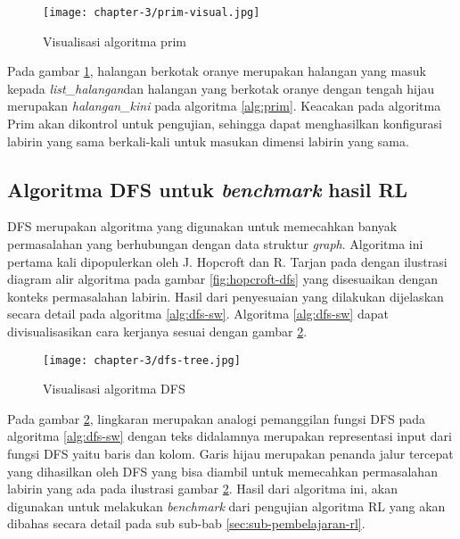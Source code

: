 \begin{figure}[H]
	\centering
	\texttt{[image: chapter-3/prim-visual.jpg]}
	\caption{Visualisasi algoritma prim}
	\label{fig:prim-visual}
\end{figure}

Pada gambar \ref{fig:prim-visual}, halangan berkotak oranye merupakan halangan yang masuk kepada \textit{list\_halangan}dan halangan yang berkotak oranye dengan tengah hijau merupakan \textit{halangan\_kini} pada algoritma \ref{alg:prim}. Keacakan pada algoritma Prim akan dikontrol untuk pengujian, sehingga dapat menghasilkan konfigurasi labirin yang sama berkali-kali untuk masukan dimensi labirin yang sama.

\subsection{Algoritma \ac{DFS} untuk \textit{benchmark} hasil \acl{RL}}
\label{sec:sub-dfs}

\acf{DFS} merupakan algoritma yang digunakan untuk memecahkan banyak permasalahan yang berhubungan dengan data struktur \textit{graph}. Algoritma ini pertama kali dipopulerkan oleh J. Hopcroft dan R. Tarjan pada \parencite{hopcroft1973algorithm} dengan ilustrasi diagram alir algoritma pada gambar \ref{fig:hopcroft-dfs} yang disesuaikan dengan konteks permasalahan labirin. Hasil dari penyesuaian yang dilakukan dijelaskan secara detail pada algoritma \ref{alg:dfs-sw}. Algoritma \ref{alg:dfs-sw} dapat divisualisasikan cara kerjanya sesuai dengan gambar \ref{fig:dfs-visualization}.

\begin{figure}[H]
	\centering
	\texttt{[image: chapter-3/dfs-tree.jpg]}
	\caption{Visualisasi algoritma \ac{DFS}}
	\label{fig:dfs-visualization}
\end{figure}

Pada gambar \ref{fig:dfs-visualization}, lingkaran merupakan analogi pemanggilan fungsi \ac{DFS} pada algoritma \ref{alg:dfs-sw} dengan teks didalamnya merupakan representasi input dari fungsi \ac{DFS} yaitu baris dan kolom. Garis hijau merupakan penanda jalur tercepat yang dihasilkan oleh DFS yang bisa diambil untuk memecahkan permasalahan labirin yang ada pada ilustrasi gambar \ref{fig:dfs-visualization}. Hasil dari algoritma ini, akan digunakan untuk melakukan \textit{benchmark} dari pengujian algoritma \ac{RL} yang akan dibahas secara detail pada sub sub-bab \ref{sec:sub-pembelajaran-rl}.

